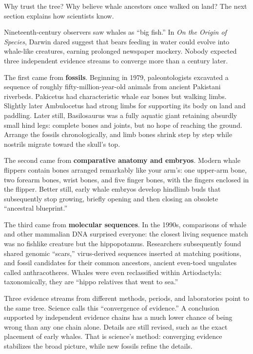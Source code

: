 Why trust the tree? Why believe whale ancestors once walked on land? The next section explains how scientists know.

\begin{zhengju}
Nineteenth-century observers saw whales as ``big fish.'' In \emph{On the Origin of Species}, Darwin dared suggest that bears feeding in water could evolve into whale-like creatures, earning prolonged newspaper mockery. Nobody expected three independent evidence streams to converge more than a century later.

The first came from \textbf{fossils}. Beginning in 1979, paleontologists excavated a sequence of roughly fifty-million-year-old animals from ancient Pakistani riverbeds. Pakicetus had characteristic whale ear bones but walking limbs. Slightly later Ambulocetus had strong limbs for supporting its body on land and paddling. Later still, Basilosaurus was a fully aquatic giant retaining absurdly small hind legs: complete bones and joints, but no hope of reaching the ground. Arrange the fossils chronologically, and limb bones shrink step by step while nostrils migrate toward the skull's top.

The second came from \textbf{comparative anatomy and embryos}. Modern whale flippers contain bones arranged remarkably like your arm's: one upper-arm bone, two forearm bones, wrist bones, and five finger bones, with the fingers enclosed in the flipper. Better still, early whale embryos develop hindlimb buds that subsequently stop growing, briefly opening and then closing an obsolete ``ancestral blueprint.''

The third came from \textbf{molecular sequences}. In the 1990s, comparisons of whale and other mammalian DNA surprised everyone: the closest living sequence match was no fishlike creature but the hippopotamus. Researchers subsequently found shared genomic ``scars,'' virus-derived sequences inserted at matching positions, and fossil candidates for their common ancestors, ancient even-toed ungulates called anthracotheres. Whales were even reclassified within Artiodactyla: taxonomically, they are ``hippo relatives that went to sea.''

Three evidence streams from different methods, periods, and laboratories point to the same tree. Science calls this ``convergence of evidence.'' A conclusion supported by independent evidence chains has a much lower chance of being wrong than any one chain alone. Details are still revised, such as the exact placement of early whales. That is science's method: converging evidence stabilizes the broad picture, while new fossils refine the details.
\end{zhengju}

